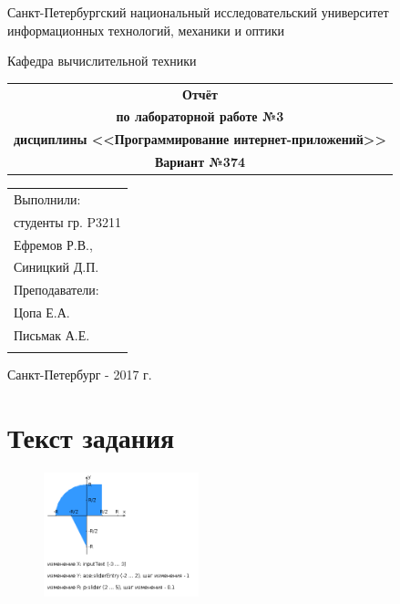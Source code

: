 \documentclass[a4paper, 12pt]{article}
\begin{document}
\begin{titlepage}
\begin{center}
{Санкт-Петербургский национальный исследовательский университет информационных технологий, механики и оптики}

Кафедра вычислительной техники
\end{center}
\vspace{50mm}
\begin{center}
\begin{tabular}{c}
\Huge{\textbf{Отчёт}}\\
\Large{\textbf{по лабораторной работе №3}}\\
\Large{\textbf{дисциплины <<Программирование интернет-приложений>>}}\\
\Large{\textbf{Вариант №374}}\\[2mm]
\end{tabular}
\end{center}
\vspace{85mm}
\begin{flushright}
\begin{tabular}{l}
Выполнили:\\
студенты гр. P3211\\
Ефремов Р.В.,\\
Синицкий Д.П.\\
Преподаватели:\\
Цопа Е.А.\\
Письмак А.Е.\\
\\
\end{tabular}
\end{flushright}
\vspace{15mm}
\begin{center}
Санкт-Петербург - 2017 г.
\end{center}
\end{titlepage}
\newpage

\section{Текст задания}


\begin{figure}
\begin{center}
\includegraphics[width=0.4\textwidth]{img/areas.png}
\end{center}
\end{figure}
\end{document}
